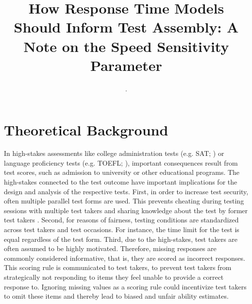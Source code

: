 \documentclass[a4paper,man,apacite,donotrepeattitle]{apa6}
\title{How Response Time Models Should Inform Test Assembly: A Note on the Speed Sensitivity Parameter
\vspace{3cm}}
\author{\color{white}.}
\affiliation{\color{white}.}
\begin{document}
\maketitle

\section{Theoretical Background}
In high-stakes assessments like college administration tests (e.g. SAT; ) or language proficiency tests (e.g. TOEFL; ), important consequences result from test scores, such as admission to university or other educational programs. The high-stakes connected to the test outcome have important implications for the design and analysis of the respective tests. First, in order to increase test security, often multiple parallel test forms are used. This prevents cheating during testing sessions with multiple test takers and sharing knowledge about the test by former test takers \cite{Luecht.2011}. Second, for reasons of fairness, testing conditions are standardized across test takers and test occasions. For instance, the time limit for the test is equal regardless of the test form. Third, due to the high-stakes, test takers are often assumed to be highly motivated. Therefore, missing responses are commonly considered informative, that is, they are scored as incorrect responses. This scoring rule is communicated to test takers, to prevent test takers from strategically not responding to items they feel unable to provide a correct response to. Ignoring missing values as a scoring rule could incentivize test takers to omit these items and thereby lead to biased and unfair ability estimates. 
\end{document}
